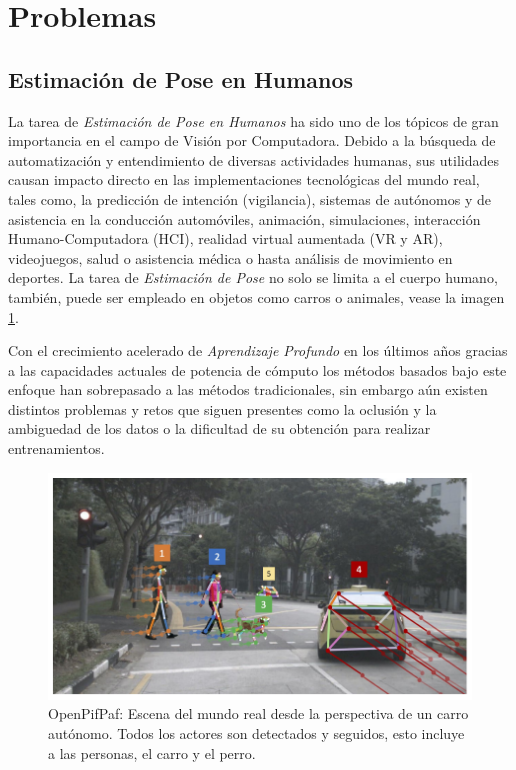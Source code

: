 \section{Problemas}

\subsection{Estimación de Pose en Humanos}

La tarea de \textit{Estimación de Pose en Humanos} ha sido uno de los tópicos de gran importancia en
el campo de Visión por Computadora. Debido a la búsqueda de automatización y entendimiento de
diversas actividades humanas, sus utilidades causan impacto directo en las implementaciones
tecnológicas del mundo real, tales como, la predicción de intención (vigilancia), sistemas de
autónomos y de asistencia en la conducción automóviles, animación, simulaciones,
interacción Humano-Computadora (HCI), realidad virtual
aumentada (VR y AR), videojuegos, salud o asistencia médica o hasta análisis de movimiento en
deportes. La tarea de \textit{Estimación de Pose} no solo se limita a el cuerpo
humano, también, puede ser empleado en objetos como carros o animales, vease la imagen \ref{fig:PE-track}.

Con el crecimiento acelerado de \textit{Aprendizaje Profundo} en los últimos años gracias a las
capacidades actuales de potencia de cómputo los métodos basados bajo este enfoque han sobrepasado
a las métodos tradicionales, sin embargo aún existen distintos problemas y retos que siguen presentes
como la oclusión y la ambiguedad de los datos o la dificultad de su obtención para realizar
entrenamientos.

\begin{figure}[ht!]
    \centering
    \includegraphics[width=0.4 \textwidth]{Chapters/1. Pose Estimation/figures/openpifpaf.png}
    \caption{OpenPifPaf: Escena del mundo real desde la perspectiva de un carro autónomo. Todos los actores
             son detectados y seguidos, esto incluye a las personas, el carro y el perro. \cite{DBLP:journals/corr/abs-2103-02440}}
    \label{fig:PE-track}
\end{figure}


